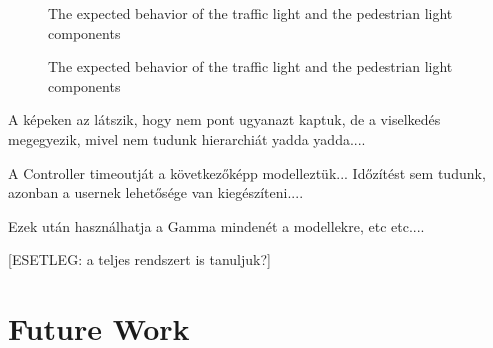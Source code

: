 \begin{figure}[!ht] 
	\centering
	\caption{The expected behavior of the traffic light and the pedestrian light components} 
	\label{fig_casestudy_expecteds}
\end{figure}

\begin{figure}[!ht] 
	\centering
	\caption{The expected behavior of the traffic light and the pedestrian light components} 
	\label{fig_casestudy_expectedcontroller}
\end{figure}

A képeken az látszik, hogy nem pont ugyanazt kaptuk, de a viselkedés megegyezik, mivel nem tudunk hierarchiát yadda yadda....

A Controller timeoutját a következőképp modelleztük... Időzítést sem tudunk, azonban a usernek lehetősége van kiegészíteni....

Ezek után használhatja a Gamma mindenét a modellekre, etc etc....

[ESETLEG: a teljes rendszert is tanuljuk?]

\section{Future Work} \label{sec_futurework}

